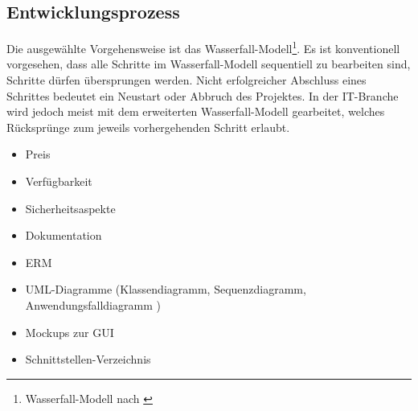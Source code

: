 \subsection{Entwicklungsprozess}
\label{sec:Entwicklungsprozess}

Die ausgewählte Vorgehensweise ist das Wasserfall-Modell\footnote{Wasserfall-Modell nach \cite{wasserfallRoyce}}. Es ist konventionell vorgesehen, dass alle Schritte im Wasserfall-Modell sequentiell zu bearbeiten sind, \dahe Schritte dürfen übersprungen werden. Nicht erfolgreicher Abschluss eines Schrittes bedeutet ein Neustart oder Abbruch des Projektes. In der IT-Branche wird jedoch meist mit dem erweiterten Wasserfall-Modell gearbeitet, welches Rücksprünge zum jeweils vorhergehenden Schritt erlaubt.

\begin{enumerate}
		\begin{itemize}
			\item Preis
			\item Verfügbarkeit
			\item Sicherheitsaspekte
			\item Dokumentation
		\end{itemize}
	
	

		\begin{itemize}
			\item \ac{ERM}
			\item \acs{UML}-Diagramme (Klassendiagramm, Sequenzdiagramm, Anwendungsfalldiagramm \usw)
			\item Mockups zur \acs{GUI}
			\item Schnittstellen-Verzeichnis
		\end{itemize}
	

\end{enumerate}

